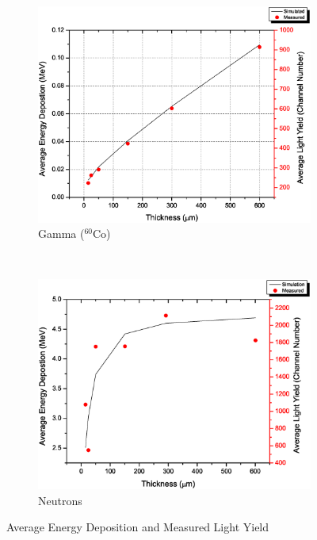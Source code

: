 \documentclass{anstrans}
\newcommand{\iso}[2]{${}^{#2}${#1}}
\newcommand{\figurewidth}{0.45\textwidth}
\begin{document}
\begin{figure}[!ht]
	\centering
	\begin{subfigure}[b]{\figurewidth}
    		\includegraphics[width=\textwidth]{G4EDep_LightYield_Co60}
		\caption{Gamma (\iso{Co}{60})}
	\end{subfigure}%
	~
	\begin{subfigure}[b]{\figurewidth}
    		\includegraphics[width=\textwidth]{G4EDep_LightYield_Neutron}
		\caption{Neutrons}
	\end{subfigure}%
	\caption{Average Energy Deposition and Measured Light Yield}
	\label{fig:EDepLightYield}
\end{figure}
\end{document}
